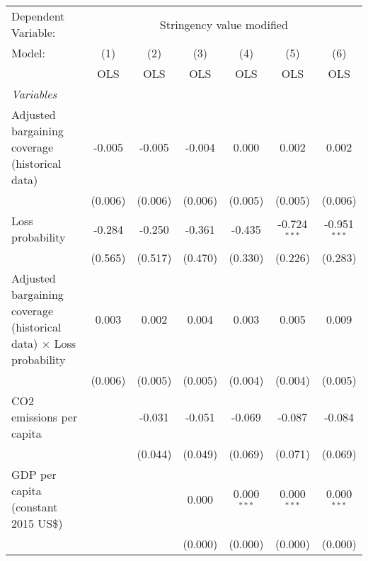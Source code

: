 
\begingroup
\centering
\begin{tabular}{lcccccc}
   \toprule
   Dependent Variable: & \multicolumn{6}{c}{Stringency value modified}\\
   Model:                                                                    & (1)     & (2)     & (3)     & (4)           & (5)            & (6)\\  
                                                                             &  OLS    & OLS     & OLS     & OLS           & OLS            & OLS\\  
   \midrule
   \emph{Variables}\\
   Adjusted bargaining coverage (historical data)                            & -0.005  & -0.005  & -0.004  & 0.000         & 0.002          & 0.002\\   
                                                                             & (0.006) & (0.006) & (0.006) & (0.005)       & (0.005)        & (0.006)\\   
   Loss probability                                                          & -0.284  & -0.250  & -0.361  & -0.435        & -0.724$^{***}$ & -0.951$^{***}$\\   
                                                                             & (0.565) & (0.517) & (0.470) & (0.330)       & (0.226)        & (0.283)\\   
   Adjusted bargaining coverage (historical data) $\times$ Loss probability  & 0.003   & 0.002   & 0.004   & 0.003         & 0.005          & 0.009\\   
                                                                             & (0.006) & (0.005) & (0.005) & (0.004)       & (0.004)        & (0.005)\\   
   CO2 emissions per capita                                                  &         & -0.031  & -0.051  & -0.069        & -0.087         & -0.084\\   
                                                                             &         & (0.044) & (0.049) & (0.069)       & (0.071)        & (0.069)\\   
   GDP per capita (constant 2015 US\$)                                       &         &         & 0.000   & 0.000$^{***}$ & 0.000$^{***}$  & 0.000$^{***}$\\   
                                                                             &         &         & (0.000) & (0.000)       & (0.000)        & (0.000)\\   

\end{tabular}
